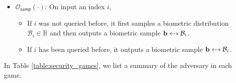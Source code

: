 \begin{itemize}
	\item $\mathcal{O}_\textsf{samp}(\cdot)$: On input an index $i$,
	\begin{itemize}
		\item If $i$ was not queried before, it first samples a biometric distribution $\mathcal{B}_i \in \mathbb{B}$ and then outputs a biometric sample $\mathbf{b} \getsdollar \mathcal{B}_i$.
		\item If $i$ has been queried before, it outputs a biometric sample $\mathbf{b} \getsdollar \mathcal{B}_i$.
	\end{itemize}
\end{itemize}

\iffalse

In Table \ref{table:security_games}, we list a summary of the adversary in each game.

